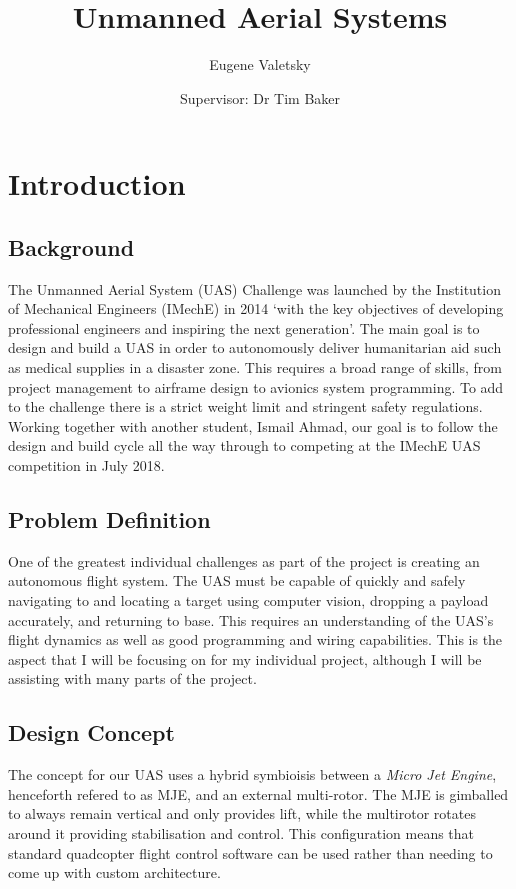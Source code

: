 \documentclass[10pt]{article}
\author{Eugene Valetsky\\ \and Supervisor: Dr Tim Baker}
\title{Unmanned Aerial Systems}
\begin{document}
\maketitle

\section{Introduction}
\subsection{Background}
The Unmanned Aerial System (UAS) Challenge was launched by the Institution of Mechanical Engineers (IMechE) in 2014 `with the key objectives of developing professional engineers and inspiring the next generation'\cite{IMechE_about_uas}. The main goal is to design and build a UAS in order to autonomously deliver humanitarian aid such as medical supplies in a disaster zone. This requires a broad range of skills, from project management to airframe design to avionics system programming. To add to the challenge there is a strict weight limit and stringent safety regulations. Working together with another student, Ismail Ahmad, our goal is to follow the design and build cycle all the way through to competing at the IMechE UAS competition in July 2018.

\subsection{Problem Definition}
One of the greatest individual challenges as part of the project is creating an autonomous flight system. The UAS must be capable of quickly and safely navigating to and locating a target using computer vision, dropping a payload accurately, and returning to base. This requires an understanding of the UAS’s flight dynamics as well as good programming and wiring capabilities. This is the aspect that I will be focusing on for my individual project, although I will be assisting with many parts of the project.

\subsection{Design Concept}
The concept for our UAS uses a hybrid symbioisis between a \emph{Micro Jet Engine}, henceforth refered to as MJE, and an external multi-rotor. The MJE is gimballed to always remain vertical and only provides lift, while the multirotor rotates around it providing stabilisation and control. This configuration means that standard quadcopter flight control software can be used rather than needing to come up with custom architecture.
\end{document}
